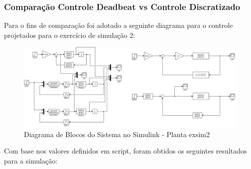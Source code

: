\documentclass[a4paper,11pt]{article}
\begin{document}
\subsubsection{Comparação Controle Deadbeat vs Controle Discratizado}

Para o fins de comparação foi adotado a seguinte diagrama para o controle projetados para o exercício de simulação 2:

\begin{figure}[H]
    \centering
    \includegraphics[width=1\linewidth]{img/exsim2model.png}
    \caption{Diagrama de Blocos do Sistema no Simulink - Planta exsim2}
\end{figure}

Com base nos valores definidos em script, foram obtidos os seguintes resultados para a simulação:
\end{document}

